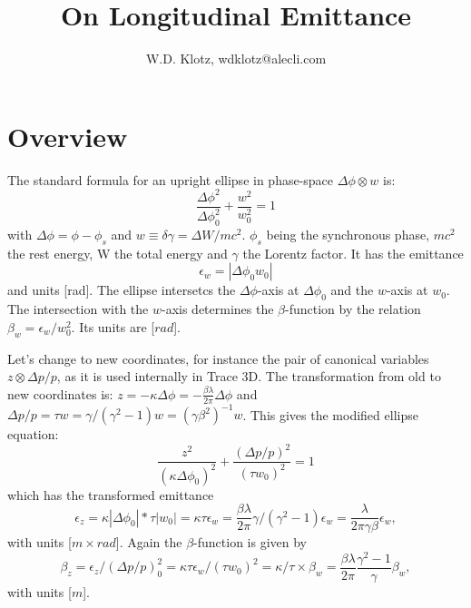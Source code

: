 \documentclass{article}
\title{On Longitudinal Emittance}
\author{W.D. Klotz, wdklotz@alecli.com}
\begin{document}
\maketitle

\section{Overview}
The standard formula for an upright ellipse in phase-space $\Delta\phi\otimes w$ is:
\begin{equation}
\frac{\Delta\phi^{2}}{\Delta\phi_{0}^{2}}+\frac{w^{2}}{w_{0}^{2}}=1 \label{}
\end{equation}
with $ \Delta\phi = \phi - \phi_{s} $ and $ w \equiv \delta\gamma = \Delta W/mc^{2} $.
$ \phi_{s} $ being the synchronous phase, $ mc^{2} $ the rest energy, W the total energy and $ \gamma $ the Lorentz factor.
It has the emittance
\begin{equation}
\epsilon_{w} = |\Delta\phi_{0}w_{0}| \label{}
\end{equation}
and units [rad].
The ellipse intersetcs the $ \Delta\phi $-axis at $ \Delta\phi_{0} $ and the $ w $-axis at $ w_{0} $.
The intersection with the $w$-axis determines the $\beta$-function by the relation $\beta_{w} = \epsilon_{w}/w_{0}^{2}$. Its units are [$rad$].

Let's change to new coordinates, for instance the pair of canonical variables   $ z\otimes \Delta p/p $, as it is used internally in Trace 3D.
The transformation from old to new coordinates is:
$ z = -\kappa\Delta\phi =  -\frac{\beta \lambda} {2 \pi}  \Delta\phi $ and $ \Delta p/p = \tau w = \gamma/(\gamma^{2}-1) w = (\gamma \beta^{2})^{-1} w $.
This gives the modified ellipse equation:
\begin{equation}
\frac{z^{2}}{{(\kappa\Delta\phi_{0})}^{2}}+\frac{(\Delta p/p)^{2}}{{(\tau w_{0})^{2}}}=1 \label{}
\end{equation}
which has the transformed emittance 
\begin{equation}
\epsilon_{z} =  \kappa|\Delta\phi_{0}|*\tau |w_{0}| = \kappa\tau\epsilon_{w} = \frac{\beta \lambda} {2 \pi} \gamma/(\gamma^{2}-1) \epsilon_{w} = \frac{\lambda} {2 \pi \gamma \beta} \epsilon_{w}\label{},
\end{equation}
with units [$m\times rad$]. Again the $\beta$-function is given by 
\begin{equation}
\beta_{z}=\epsilon_{z}/(\Delta p/p)_{0}^{2}=\kappa\tau\epsilon_{w}/(\tau w_{0})^2=\kappa/\tau\times\beta_{w}=\frac{\beta \lambda}{2 \pi}\frac{\gamma^2-1}{\gamma}\beta_{w},
\end{equation}
with units [$m$].
\end{document}
